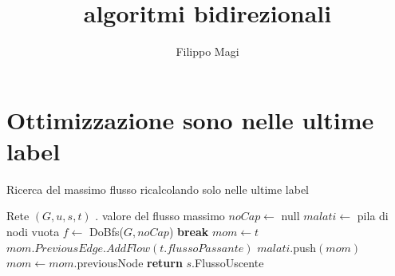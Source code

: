 \documentclass{article}
\title{algoritmi bidirezionali}
\author{Filippo Magi }
\begin{document}
\maketitle

\section{Ottimizzazione sono nelle ultime label}
\begin{algorithm}
    \caption{Ricerca del massimo flusso ricalcolando solo nelle ultime label}
    \begin{algorithmic}
        \REQUIRE Rete $(G,u,s,t)$ .
        \ENSURE valore del flusso massimo
        \STATE $noCap \leftarrow$ null
        \STATE $malati \leftarrow$ pila di nodi vuota
        \STATE $f \leftarrow$ DoBfs($G,noCap$)
        \STATE \textbf{break}
        \ENDIF
        \STATE $mom \leftarrow t$
        \STATE $mom.PreviousEdge.AddFlow(t.flussoPassante)$
        \STATE $malati.$push$(mom)$
        \ENDIF
        \STATE $mom \leftarrow mom$.previousNode
        \ENDWHILE
        \ENDWHILE
        \STATE \textbf{return} $s$.FlussoUscente
    \end{algorithmic}
\end{algorithm}
\end{document}
